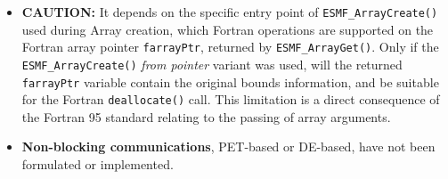 
\begin{itemize}
\label{Array:rest}

\item {\bf CAUTION:} It depends on the specific entry point of {\tt ESMF\_ArrayCreate()} used during Array creation, which Fortran operations are supported on the Fortran array pointer {\tt farrayPtr}, returned by {\tt ESMF\_ArrayGet()}. Only if the {\tt ESMF\_ArrayCreate()} {\em from pointer} variant was used, will the returned {\tt farrayPtr} variable contain the original bounds information, and be suitable for the Fortran {\tt deallocate()} call. This limitation is a direct consequence of the Fortran 95 standard relating to the passing of array arguments.

\item {\bf Non-blocking communications}, PET-based or DE-based, have not been formulated or implemented.
\end{itemize}
